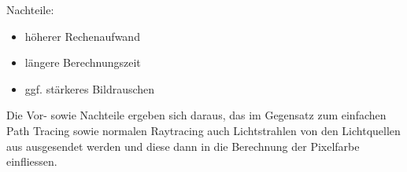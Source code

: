 \documentclass[12pt]{scrreprt}
\begin{document}
Nachteile:

\begin{itemize}
  \item höherer Rechenaufwand
  \item längere Berechnungszeit
  \item ggf. stärkeres Bildrauschen
\end{itemize}

Die Vor- sowie Nachteile ergeben sich daraus, das im Gegensatz zum einfachen Path Tracing sowie normalen Raytracing auch Lichtstrahlen von den Lichtquellen aus ausgesendet werden und diese dann in die Berechnung der Pixelfarbe einfliessen.
\end{document}
